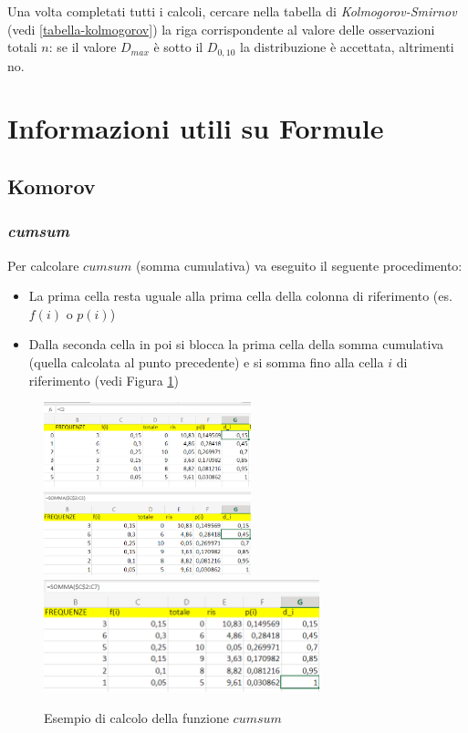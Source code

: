 Una volta completati tutti i calcoli, cercare nella tabella di
\textit{Kolmogorov-Smirnov} (vedi \ref{tabella-kolmogorov}) la riga corrispondente al valore delle osservazioni
totali $n$: se il valore $D_{max}$ è sotto il $D_{0,10}$ la distribuzione è
accettata, altrimenti no.

\section{Informazioni utili su Formule}

\subsection{Komorov}

\subsubsection{\textit{cumsum}}

Per calcolare $cumsum$ (somma cumulativa) va eseguito il seguente procedimento:
\begin{itemize}
      \item La prima cella resta uguale alla prima cella della colonna di
            riferimento (es. $f(i)$ o $p(i)$)
      \item Dalla seconda cella in poi si blocca la prima cella della somma
            cumulativa (quella calcolata al punto precedente) e si somma fino alla
            cella $i$ di riferimento (vedi Figura \ref{cumsum})
\end{itemize}

\begin{figure}[H]
      \centering
      \includegraphics[width=6cm, keepaspectratio]{capitoli/goodnes_of_fit/imgs/cumsum1.png}
      \includegraphics[width=6cm, keepaspectratio]{capitoli/goodnes_of_fit/imgs/cumsum2.png}
      \includegraphics[width=8cm, keepaspectratio]{capitoli/goodnes_of_fit/imgs/cumsum3.png}
      \caption{Esempio di calcolo della funzione $cumsum$}
      \label{cumsum}
\end{figure}